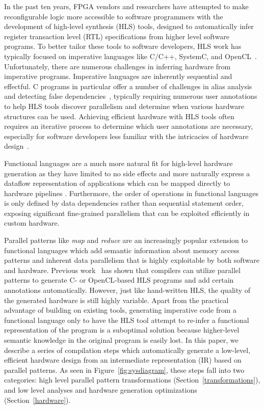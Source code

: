 \documentclass[pageno]{jpaper}
\begin{document}
In the past ten years, FPGA vendors and researchers have attempted to make reconfigurable logic more accessible to software programmers with the
development of high-level synthesis (HLS) tools, designed to automatically infer register transaction level (RTL) specifications from higher level software programs. To better tailor these tools to software developers, HLS work has typically focused on imperative languages like C/C++, SystemC, and OpenCL~\cite{opencl}.
Unfortunately, there are numerous challenges in inferring hardware from imperative programs.
Imperative languages are inherently sequential and effectful. C programs in particular offer a number of challenges in alias analysis and detecting false dependencies~\cite{edwards}, typically requiring numerous user annotations to help HLS tools discover parallelism and determine when various hardware structures can be used.
Achieving efficient hardware with HLS tools often requires an iterative process to determine which user annotations are necessary, especially
for software developers less familiar with the intricacies of hardware design~\cite{cong11hls}.

Functional languages are a much more natural fit for high-level hardware generation as they have limited to no side effects and more naturally express a dataflow representation of applications which can be mapped directly to hardware pipelines \cite{fpgaMasses}. Furthermore, the order of operations in functional languages is only defined by data dependencies rather than sequential statement order, exposing significant fine-grained parallelism that can be exploited efficiently in custom hardware. 

Parallel patterns like \emph{map} and \emph{reduce} are an increasingly popular extension to functional languages which add semantic information about memory access
patterns and inherent data parallelism that is highly exploitable by both software and hardware.
Previous work~\cite{george14fpl, auerbach10lime} has shown that compilers can utilize parallel patterns to generate C- or OpenCL-based HLS programs and add certain annotations automatically.
However, just like hand-written HLS, the quality of the generated hardware is still highly variable.
Apart from the practical advantage of building on existing tools,
generating imperative code from a functional language only to have the HLS tool attempt to re-infer a
functional representation of the program is a suboptimal solution because higher-level semantic knowledge in
the original program is easily lost.
In this paper, we describe a series of compilation steps which automatically generate a low-level, efficient hardware design
from an intermediate representation (IR) based on parallel patterns.
As seen in Figure~\ref{fig:sysdiagram}, these steps fall into two categories: high level parallel pattern transformations (Section~\ref{transformations}),
and low level analyses and hardware generation optimizations (Section~\ref{hardware}).
\end{document}

